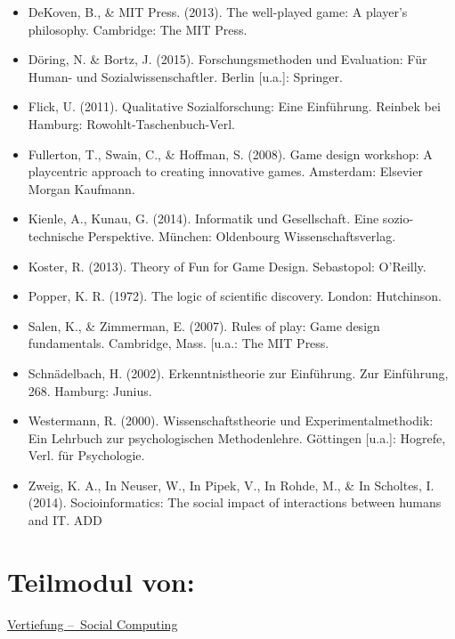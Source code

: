 \begin{itemize}
\tightlist
\item
  DeKoven, B., \& MIT Press. (2013). The well-played game: A player's
  philosophy. Cambridge: The MIT Press.
\item
  Döring, N. \& Bortz, J. (2015). Forschungsmethoden und Evaluation: Für
  Human- und Sozialwissenschaftler. Berlin {[}u.a.{]}: Springer.
\item
  Flick, U. (2011). Qualitative Sozialforschung: Eine Einführung.
  Reinbek bei Hamburg: Rowohlt-Taschenbuch-Verl.
\item
  Fullerton, T., Swain, C., \& Hoffman, S. (2008). Game design workshop:
  A playcentric approach to creating innovative games. Amsterdam:
  Elsevier Morgan Kaufmann.
\item
  Kienle, A., Kunau, G. (2014). Informatik und Gesellschaft. Eine
  sozio-technische Perspektive. München: Oldenbourg Wissenschaftsverlag.
\item
  Koster, R. (2013). Theory of Fun for Game Design. Sebastopol:
  O'Reilly.
\item
  Popper, K. R. (1972). The logic of scientific discovery. London:
  Hutchinson.
\item
  Salen, K., \& Zimmerman, E. (2007). Rules of play: Game design
  fundamentals. Cambridge, Mass. {[}u.a.: The MIT Press.
\item
  Schnädelbach, H. (2002). Erkenntnistheorie zur Einführung. Zur
  Einführung, 268. Hamburg: Junius.
\item
  Westermann, R. (2000). Wissenschaftstheorie und Experimentalmethodik:
  Ein Lehrbuch zur psychologischen Methodenlehre. Göttingen {[}u.a.{]}:
  Hogrefe, Verl. für Psychologie.
\item
  Zweig, K. A., In Neuser, W., In Pipek, V., In Rohde, M., \& In
  Scholtes, I. (2014). Socioinformatics: The social impact of
  interactions between humans and IT. ADD
\end{itemize}

\hypertarget{teilmodul-vonpathlabelmi-2017modulbeschreibungen-bachelorba_sc_soziotechnische-systeme}{%
\section*{Teilmodul
von:\label{/mi-2017/modulbeschreibungen-bachelor/BA_SC_soziotechnische-systeme}}\label{teilmodul-vonpathlabelmi-2017modulbeschreibungen-bachelorba_sc_soziotechnische-systeme}}

\hyperref[/mi-2017/modulbeschreibungen-bachelor/BA_Vertiefung_SocialComputing]{Vertiefung – Social Computing}

